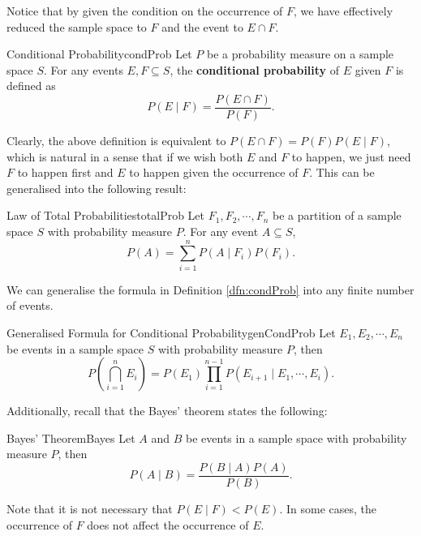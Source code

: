 \documentclass[math, code]{amznotes}
\theoremstyle{remark}
\begin{document}
Notice that by given the condition on the occurrence of $F$, we have effectively reduced the sample space to $F$ and the event to $E \cap F$.
\begin{dfnbox}{Conditional Probability}{condProb}
    Let $P$ be a probability measure on a sample space $S$. For any events $E, F \subseteq S$, the {\color{red} \textbf{conditional probability}} of $E$ given $F$ is defined as 
    \begin{equation*}
        P\left(E \mid F\right) = \frac{P\left(E \cap F\right)}{P\left(F\right)}.
    \end{equation*}
\end{dfnbox}
Clearly, the above definition is equivalent to $P\left(E \cap F\right) = P\left(F\right)P\left(E \mid F\right)$, which is natural in a sense that if we wish both $E$ and $F$ to happen, we just need $F$ to happen first and $E$ to happen given the occurrence of $F$. This can be generalised into the following result:
\begin{thmbox}{Law of Total Probabilities}{totalProb}
    Let $F_1, F_2, \cdots, F_n$ be a partition of a sample space $S$ with probability measure $P$. For any event $A \subseteq S$, 
    \begin{equation*}
        P\left(A\right) = \sum_{i = 1}^{n}P\left(A \mid F_i\right)P\left(F_i\right).
    \end{equation*}
\end{thmbox}
We can generalise the formula in Definition \ref{dfn:condProb} into any finite number of events.
\begin{probox}{Generalised Formula for Conditional Probability}{genCondProb}
    Let $E_1, E_2, \cdots, E_n$ be events in a sample space $S$ with probability measure $P$, then 
    \begin{equation*}
        P\left(\bigcap_{i = 1}^nE_i\right) = P\left(E_1\right)\prod_{i = 1}^{n - 1}P\left(E_{i + 1} \mid E_1, \cdots, E_i\right).
    \end{equation*}
\end{probox}
Additionally, recall that the Bayes' theorem states the following:
\begin{thmbox}{Bayes' Theorem}{Bayes}
    Let $A$ and $B$ be events in a sample space with probability measure $P$, then 
    \begin{equation*}
        P\left(A \mid B\right) = \frac{P\left(B \mid A\right)P\left(A\right)}{P\left(B\right)}.
    \end{equation*}
\end{thmbox}
Note that it is not necessary that $P\left(E \mid F\right) < P\left(E\right)$. In some cases, the occurrence of $F$ does not affect the occurrence of $E$.
\end{document}
